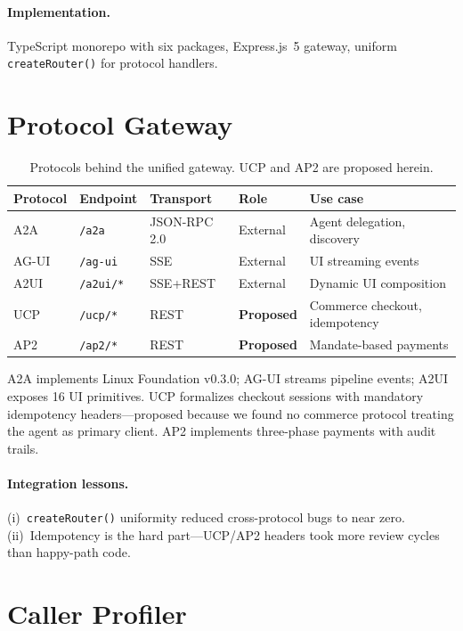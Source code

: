 \documentclass[11pt]{article}
\begin{document}
\paragraph{Implementation.}
TypeScript monorepo with six packages, Express.js~5 gateway, uniform \texttt{createRouter()} for protocol handlers.

\section{Protocol Gateway}
\label{sec:protocols}

\begin{table}[t]
  \small
  \centering
  \begin{tabular}{llllp{5cm}}
    \toprule
    Protocol & Endpoint & Transport & Role & Use case \\
    \midrule
    A2A  & \texttt{/a2a} & JSON-RPC 2.0 & External & Agent delegation, discovery \\
    AG-UI & \texttt{/ag-ui} & SSE & External & UI streaming events \\
    A2UI & \texttt{/a2ui/*} & SSE+REST & External & Dynamic UI composition \\
    UCP  & \texttt{/ucp/*} & REST & \textbf{Proposed} & Commerce checkout, idempotency \\
    AP2  & \texttt{/ap2/*} & REST & \textbf{Proposed} & Mandate-based payments \\
    \bottomrule
  \end{tabular}
  \caption{Protocols behind the unified gateway. UCP and AP2 are proposed herein.}
  \label{tab:protocols}
\end{table}

A2A implements Linux Foundation v0.3.0; AG-UI streams pipeline events; A2UI exposes 16 UI primitives. UCP formalizes checkout sessions with mandatory idempotency headers---proposed because we found no commerce protocol treating the agent as primary client. AP2 implements three-phase payments with audit trails.

\paragraph{Integration lessons.} (i)~\texttt{createRouter()} uniformity reduced cross-protocol bugs to near zero. (ii)~Idempotency is the hard part---UCP/AP2 headers took more review cycles than happy-path code.

\section{Caller Profiler}
\label{sec:profiler}
\end{document}

